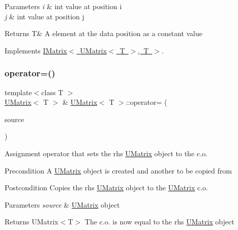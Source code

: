 \begin{DoxyParams}{Parameters}
{\em i} & int value at position i \\
\hline
{\em j} & int value at position j \\
\hline
\end{DoxyParams}
\begin{DoxyReturn}{Returns}
T\& A element at the data position as a constant value 
\end{DoxyReturn}


Implements \mbox{\hyperlink{class_i_matrix_a2abf1a0d2454051da3ccf9cacf12797e}{I\+Matrix$<$ U\+Matrix$<$ T $>$, T $>$}}.

\mbox{\label{class_u_matrix_a3f12f4544a460dd93dac8a883654310f}} 
\subsubsection{\texorpdfstring{operator=()}{operator=()}\hspace{0.1cm}{\footnotesize\ttfamily [1/2]}}
{\footnotesize\ttfamily template$<$class T $>$ \\
\mbox{\hyperlink{class_u_matrix}{U\+Matrix}}$<$ T $>$ \& \mbox{\hyperlink{class_u_matrix}{U\+Matrix}}$<$ T $>$\+::operator= (\begin{DoxyParamCaption}\item[{const \mbox{\hyperlink{class_u_matrix}{U\+Matrix}}$<$ T $>$ \&}]{source }\end{DoxyParamCaption})\hspace{0.3cm}{\ttfamily [virtual]}}



Assignment operator that sets the rhs \mbox{\hyperlink{class_u_matrix}{U\+Matrix}} object to the c.\+o. 

\begin{DoxyPrecond}{Precondition}
A \mbox{\hyperlink{class_u_matrix}{U\+Matrix}} object is created and another to be copied from 
\end{DoxyPrecond}
\begin{DoxyPostcond}{Postcondition}
Copies the rhs \mbox{\hyperlink{class_u_matrix}{U\+Matrix}} object to the \mbox{\hyperlink{class_u_matrix}{U\+Matrix}} c.\+o. 
\end{DoxyPostcond}

\begin{DoxyParams}{Parameters}
{\em source} & \mbox{\hyperlink{class_u_matrix}{U\+Matrix}} object \\
\hline
\end{DoxyParams}
\begin{DoxyReturn}{Returns}
U\+Matrix$<$\+T$>$ The c.\+o. is now equal to the rhs \mbox{\hyperlink{class_u_matrix}{U\+Matrix}} object 
\end{DoxyReturn}


